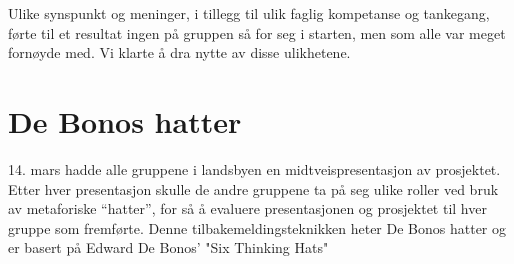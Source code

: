 Ulike synspunkt og meninger, i tillegg til ulik faglig kompetanse og
tankegang, førte til et resultat ingen på gruppen så for seg i starten,
men som alle var meget fornøyde med. Vi klarte å dra nytte av disse
ulikhetene.


\section{De Bonos hatter} %
14. mars hadde alle gruppene i landsbyen en midtveispresentasjon av prosjektet. Etter hver presentasjon skulle de andre gruppene ta på seg ulike roller ved bruk av metaforiske “hatter”, for så å evaluere presentasjonen og prosjektet til hver gruppe som fremførte. Denne tilbakemeldingsteknikken heter De Bonos hatter og er basert på Edward De Bonos' "Six Thinking Hats" \cite{bonos}